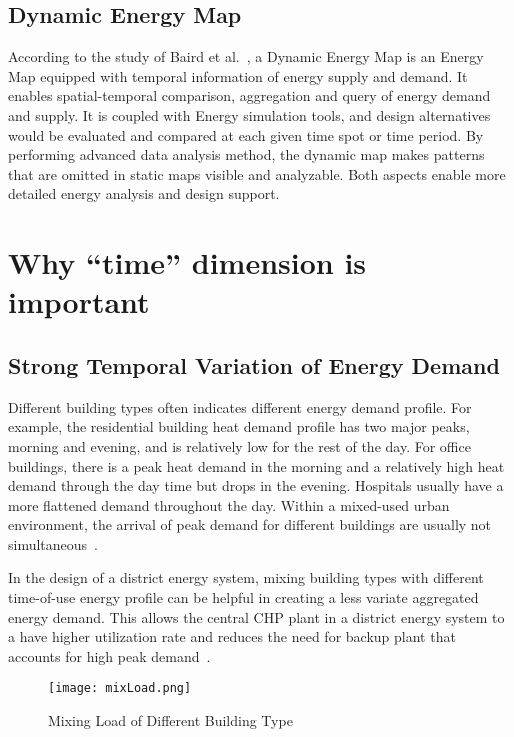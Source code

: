 \subsection{Dynamic Energy Map}
According to the study of Baird et al.\ , a Dynamic Energy Map is an
Energy Map equipped with temporal information of energy supply and
demand. It enables spatial-temporal comparison, aggregation and query
of energy demand and supply. It is coupled with Energy simulation
tools, and design alternatives would be evaluated and compared at each
given time spot or time period. By performing advanced data analysis
method, the dynamic map makes patterns that are omitted in static maps
visible and analyzable. Both aspects enable more detailed energy
analysis and design support.

\section{Why ``time'' dimension is important}
\subsection{Strong Temporal Variation of Energy Demand}
Different building types often indicates different energy demand
profile. For example, the residential building heat demand profile has
two major peaks, morning and evening, and is relatively low for the
rest of the day. For office buildings, there is a peak heat demand in
the morning and a relatively high heat demand through the day time but
drops in the evening. Hospitals usually have a more flattened demand
throughout the day. Within a mixed-used urban environment, the arrival
of peak demand for different buildings are usually not
simultaneous~\cite{decentralHeatMap2011}.

In the design of a district energy system, mixing building types with
different time-of-use energy profile can be helpful in creating a less
variate aggregated energy demand. This allows the central CHP plant in
a district energy system to a have higher utilization rate and reduces
the need for backup plant that accounts for high peak
demand~\cite{decentralHeatMap2011}.

\begin{figure}[h!]
  \centering
  \texttt{[image: mixLoad.png]}
  \caption[Mixing Load Graph]{Mixing Load of Different Building
    Type~\cite{decentralHeatMap2011}}
  \label{fig:mixLoad}
\end{figure}

